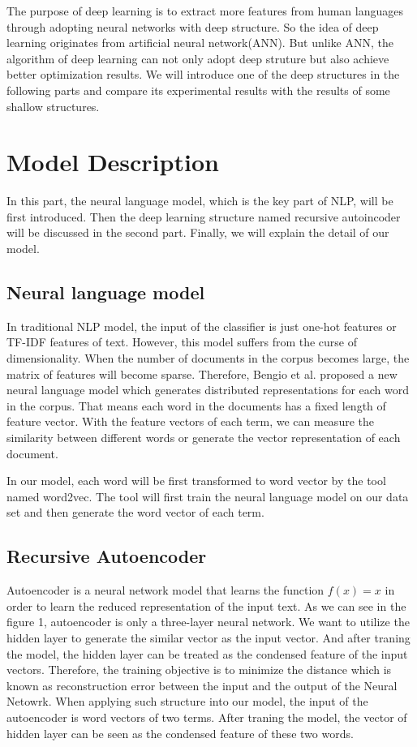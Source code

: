 \documentclass[dvips,9pt]{article}
\begin{document}
The purpose of deep learning is to extract more features from human languages through adopting neural networks with deep structure. So the idea of deep learning originates from artificial neural network(ANN). But unlike ANN, the algorithm of deep learning can not only adopt deep struture but also achieve better optimization results. We will introduce one of the deep structures in the following parts and compare its experimental results with the results of some shallow structures.
	\section{Model Description}
In this part, the neural language model, which is the key part of NLP, will be first introduced. Then the deep learning structure named recursive  autoincoder will be discussed in the second part. Finally, we will explain the detail of our model.
\subsection{Neural language model}
In traditional NLP model, the input of the classifier is just one-hot features or TF-IDF features of text. However, this model suffers from the curse of dimensionality. When the number of documents in the corpus becomes large, the matrix of features will become sparse. Therefore, Bengio et al.\cite{Bengio2003NLP} proposed a new neural language model which generates distributed representations for each word in the corpus. That means each word in the documents has a fixed length of feature vector. With the feature vectors of each term, we can measure the similarity between different words or generate the vector representation of each document.

In our model, each word will be first transformed to word vector by the tool named word2vec\cite{mikolov2013efficient}. The tool will first train the neural language model on our data set and then generate the word vector of each term.

\subsection{Recursive Autoencoder}
Autoencoder is a neural network model that learns the function $f(x)=x$ in order to learn the reduced representation of the input text. As we can see in the figure 1, autoencoder is only a three-layer neural network. We want to utilize the hidden layer to generate the similar vector as the input vector. And after traning the model, the hidden layer can be treated as the condensed feature of the input vectors. Therefore, the training objective is to minimize the distance which is known as reconstruction error between the input and the output of the Neural Netowrk. When applying such structure into our model, the input of the autoencoder is word vectors of two terms. After traning the model, the vector of hidden layer can be seen as the condensed feature of these two words.
\end{document}
